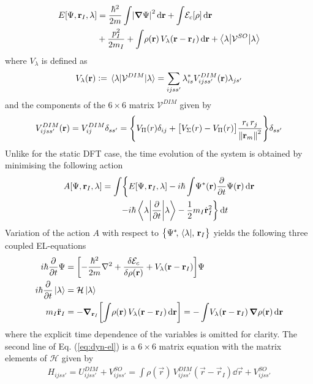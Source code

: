 			\begin{align}
				E[\Psi, \vec{r}_I, \lambda] &= \frac{\hbar^2}{2m}\int\!\abs{\grad \Psi}^2\diff{r}
				+ \int\!{\cal E}_c[\rho]\diff{r} \nonumber \\
				&+ \frac{p^2_I}{2 m_I}
				+ \int\!\rho(\vec{r})\,V_\lambda(\vec{r}-\vec{r}_I)\diff{r}
				+ \ev**{\mathcal{V}^{SO}}{\lambda}
			\end{align}
			where $V_\lambda$ is defined as
			\begin{align}
				V_\lambda(\vec{r}) \vcentcolon= \ev{\mathcal{V}^{DIM}}{\lambda} = \sum_{ijss'}\lambda^*_{is}V^{DIM}_{ijss'}(\vec{r})\lambda_{js'} 
			\end{align}
			and the components of the $6\times6$ matrix ${\mathcal V}^{DIM}$ given by
			\begin{equation}
				V^{DIM}_{ijss'}(\bm{\mathrm{r}})=V^{DIM}_{ij}\delta_{ss'}=\qty{V_\Pi(r)\delta_{ij}+\qty\big[V_\Sigma(r)-V_\Pi(r)]\frac{r_i\,r_j}{\norm{\bm{\mathrm{r}}_m}^2}}\delta_{ss'}
			\end{equation}
			Unlike for the static DFT case, the time evolution of the system is obtained by minimising the following action
			\begin{align}
				A[\Psi,\vec{r}_I,\lambda] = \int\!\bigg\{&E[\Psi,\vec{r}_I,\lambda] -i\hbar\int \!\Psi^*(\vec{r}) \pdv{t}\Psi(\vec{r})\dd{\vec{r}} \nonumber \\
				-&i\hbar\ev**{\pdv{t}}{\lambda} - \frac{1}{2} m_I \dot{\vec{r}}^2_I\bigg\}\dd{t}
			\end{align}
			Variation of the action $A$ with respect to $\qty\big{\Psi^*\!,\,\bra\lambda\!,\,\bm{\mathrm{r}}_I}$ yields the following three coupled EL-equations
			\begin{align}
				i\hbar\pdv{t}\Psi &= \qty[-\frac{\hbar^2}{2m}\laplacian +\fdv{\mathcal{E}_c}{\rho(\mathbf{r})} + V_\lambda(\vec{r}-\vec{r}_I)]\Psi \nonumber \\
				i\hbar\pdv{t}\ket\lambda  &= \mathcal{H}\ket\lambda \nonumber \\
				m_I\ddot{\vec{r}}_I &= - \grad_{\vec{r}_I}\qty[\int\!\rho(\vec{r})\,V_\lambda(\vec{r}-\vec{r}_I)\dd{\vec{r}}] = -\int\!V_\lambda(\vec{r}-\vec{r}_I)\,\grad\rho(\vec{r})\dd{\vec{r}} \label{eq:dyn-el}
			\end{align}
			where the explicit time dependence of the variables is omitted for clarity. The second line of Eq. (\ref{eq:dyn-el}) is a $6\times 6$ matrix equation with the matrix elements of $\mathcal{H}$ given by
			\begin{align}
				H_{ijss'} = U^{DIM}_{ijss'}+V^{SO}_{ijss'} = \int\!\rho(\vec{r})\,V^{DIM}_{ijss'}(\vec{r}-\vec{r}_I)\dd{\vec{r}}+V^{SO}_{ijss'}
			\end{align}
